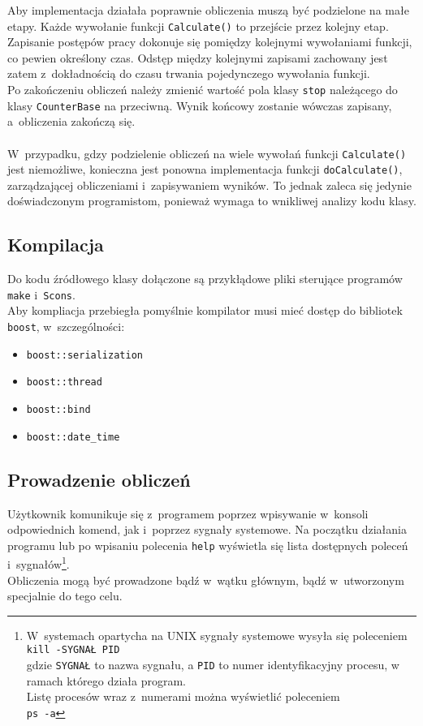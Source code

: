 \documentclass[a4paper]{article}
\begin{document}
Aby implementacja działała poprawnie obliczenia muszą być podzielone na małe etapy.
Każde wywołanie funkcji \texttt{Calculate()} to przejście przez kolejny etap.\\
Zapisanie postępów pracy dokonuje się pomiędzy kolejnymi wywołaniami funkcji, co pewien określony czas.
Odstęp między kolejnymi zapisami zachowany jest zatem z~dokładnością do czasu trwania pojedynczego wywołania funkcji.\\
Po zakończeniu obliczeń należy zmienić wartość pola klasy \texttt{stop} należącego do klasy \texttt{CounterBase} na przeciwną.
Wynik końcowy zostanie wówczas zapisany, a~obliczenia zakończą się.\\
~\\
W~przypadku, gdzy podzielenie obliczeń na wiele wywołań funkcji \texttt{Calculate()} jest niemożliwe, konieczna jest ponowna implementacja funkcji \texttt{doCalculate()}, zarządzającej obliczeniami i~zapisywaniem wyników. 
To jednak zaleca się jedynie doświadczonym programistom, ponieważ wymaga to wnikliwej analizy kodu klasy.
\subsection{Kompilacja}
Do kodu źródłowego klasy dołączone są przykłądowe pliki sterujące programów \texttt{make} i~\texttt{Scons}.\\
Aby kompliacja przebiegła pomyślnie kompilator musi mieć dostęp do bibliotek \texttt{boost}, w~szczególności:
\begin{itemize}
\item \texttt{boost::serialization}
\item \texttt{boost::thread} 
\item \texttt{boost::bind}
\item \texttt{boost::date\_time}
\end{itemize}
\subsection{Prowadzenie obliczeń}
Użytkownik komunikuje się z~programem poprzez wpisywanie w~konsoli odpowiednich komend, jak i~poprzez sygnały systemowe. 
Na początku działania programu lub po wpisaniu polecenia \texttt{help} wyświetla się lista dostępnych poleceń i~sygnałów\footnote{W~systemach opartycha na UNIX sygnały systemowe wysyła się poleceniem\\\texttt{kill -SYGNAŁ PID}\\gdzie \texttt{SYGNAŁ} to nazwa sygnału, a \texttt{PID} to numer identyfikacyjny procesu, w ramach którego działa program.\\Listę procesów wraz z~numerami można wyświetlić poleceniem\\\texttt{ps -a}}.\\
Obliczenia mogą być prowadzone bądź w~wątku głównym, bądź w~utworzonym specjalnie do tego celu.
\end{document}
